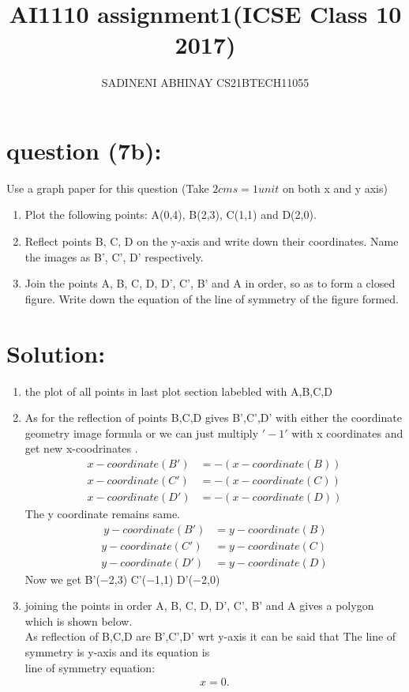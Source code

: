 \documentclass[journal,12pt,twocolumn]{IEEEtran}
\title{AI1110 assignment1(ICSE Class 10 2017)}
\author{SADINENI ABHINAY CS21BTECH11055}
\begin{document}
 \maketitle
\section{question (7b):}
Use a graph paper for this question (Take $2 cms = 1 unit$ on both x and y axis)\\
\begin{enumerate}[ label=(\roman*)]
\item Plot the following points: A(0,4), B(2,3), C(1,1) and D(2,0).
\item Reflect points B, C, D on the y-axis and write down their coordinates. Name
     the images as B', C', D' respectively.
\item Join the points A, B, C, D, D', C', B' and A in order, so as to form a closed
      figure. Write down the equation of the line of symmetry of the figure formed.
\end{enumerate}      

\section{Solution:}
\begin{enumerate}[label=(\roman*)]
\item the plot of all points in last plot section labebled with  A,B,C,D\\
\item As for the reflection of points B,C,D
 gives B',C',D' with either the coordinate geometry image formula or we can just  multiply $'-1'$ with x coordinates and get new x-coodrinates .\\
 \begin{align*}
      x-coordinate(B') &=-(x-coordinate(B))\\
      x-coordinate(C')& =-(x-coordinate(C))\\
      x-coordinate(D')& =-(x-coordinate(D))
      \end{align*}
   The y coordinate remains same.\\
  \begin{align*}\
                y-coordinate(B')&= y-coordinate(B)\\
                y-coordinate(C')&= y-coordinate(C)\\
                y-coordinate(D')&= y-coordinate(D)
                 \end{align*}
  Now we get 
    B'($-$2,3)    C'($-$1,1)    D'($-$2,0) 
 \item joining the points in order  A, B, C, D, D', C', B' and A gives a polygon which is shown below.\\
    As reflection of B,C,D are B',C',D' wrt y-axis it can be said that
    The line of symmetry is y-axis and its equation is \\
      line of symmetry equation:
    \begin{align*}
    	\label{line of symmetry equation}
    	x=0.
    \end{align*}

\end{enumerate}      
\end{document}
